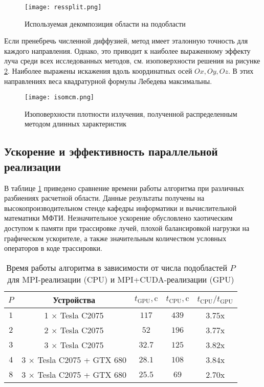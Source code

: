 \begin{figure}[ht!]
\centering
\texttt{[image: ressplit.png]}
\caption{Используемая декомпозиция области на подобласти}
\label{fig:split}
\end{figure}

Если пренебречь численной диффузией, метод имеет эталонную точность для каждого направления. Однако, это приводит к наиболее выраженному эффекту луча среди всех исследованных методов, см. изоповерхности решения на рисунке \ref{fig:isomcm}. Наиболее выражены искажения вдоль координатных осей $Ox, Oy, Oz$. В этих направлениях веса квадратурной формулы Лебедева максимальны.

\begin{figure}[ht!]
\centering
\texttt{[image: isomcm.png]}
\caption{Изоповерхности плотности излучения, полученной распределенным методом длинных характеристик}
\label{fig:isomcm}
\end{figure}

\subsection{Ускорение и эффективность параллельной реализации}

В таблице \ref{tab:speedup} приведено сравнение времени работы алгоритма при различных разбиениях расчетной области. Данные результаты получены на высокопроизводительном стенде кафедры информатики и вычислительной математики МФТИ. Незначительное ускорение обусловлено хаотическим доступом к памяти при трассировке лучей, плохой балансировкой нагрузки на графическом ускорителе, а также значительным количеством условных операторов в коде трассировки. 
\begin{table}[ht!]
\RawFloats
\centering
\caption{Время работы алгоритма в зависимости от числа подобластей $P$ для MPI-реализации (CPU) и MPI+CUDA-реализации (GPU)}
\begin{tabular}{|c|c|c|c|c|}
\hline
$P$ & Устройства & $t_\text{GPU}, \text{c}$ & $t_\text{CPU}, \text{c}$ & $t_\text{CPU} / t_\text{GPU}$\\\hline
$1$& 1 $\times$ Tesla C2075 & $117$ & $439$ & $3.75$x\\\hline
$2$& 2 $\times$ Tesla C2075 & $52$ & $196$ & $3.77$x\\\hline
$3$& 3 $\times$ Tesla C2075 & $32.7$ & $125$ & $3.82$x\\\hline
$4$& 3 $\times$ Tesla C2075 + GTX 680 & $28.1$ & $108$ & $3.84$x\\
\hline
$8$& 3 $\times$ Tesla C2075 + GTX 680 & $25.5$ & $69$ & $2.70$x\\\hline
\end{tabular}
\label{tab:speedup}
\end{table}

